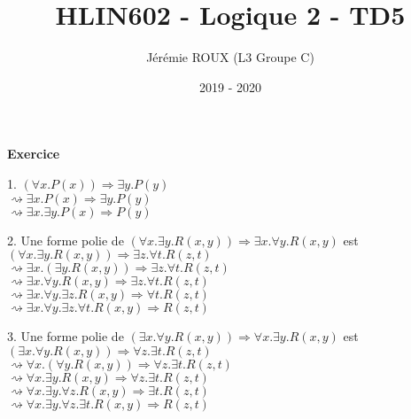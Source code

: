 \documentclass[11pt,letterpaper]{article}
\author{Jérémie ROUX (L3 Groupe C)}
\title{HLIN602 - Logique 2 - TD5}
\date{2019 - 2020}
\newcommand{\exo}[1]{\Large \textbf{Exercice \numprint{#1}} \vspace{10px} \normalsize}
\newcommand\tab[1][12pt]{\hspace*{#1}}
\begin{document}
\maketitle

\exo{1}

1. $(\forall x.P(x))\Rightarrow \exists y.P(y)$\\\tab 
$\rightsquigarrow \exists x.P(x)\Rightarrow \exists y.P(y)$\\\tab
$\rightsquigarrow \exists x.\exists y.P(x)\Rightarrow P(y)$

\vspace{13px}

2. Une forme polie de $(\forall x.\exists y.R(x,y))\Rightarrow \exists x.\forall y.R(x,y)$ est\\\tab
$(\forall x.\exists y.R(x,y))\Rightarrow \exists z.\forall t.R(z,t)$\\\tab
$\rightsquigarrow \exists x.(\exists y.R(x,y))\Rightarrow \exists z.\forall t.R(z,t)$\\\tab
$\rightsquigarrow \exists x.\forall y.R(x,y)\Rightarrow \exists z.\forall t.R(z,t)$\\\tab
$\rightsquigarrow \exists x.\forall y.\exists z.R(x,y)\Rightarrow \forall t.R(z,t)$\\\tab
$\rightsquigarrow \exists x.\forall y.\exists z.\forall t.R(x,y)\Rightarrow R(z,t)$

\vspace{13px}

3. Une forme polie de $(\exists x.\forall y.R(x,y))\Rightarrow \forall x.\exists y.R(x,y)$ est\\\tab
$(\exists x.\forall y.R(x,y))\Rightarrow \forall z.\exists t.R(z,t)$\\\tab
$\rightsquigarrow \forall x.(\forall y.R(x,y))\Rightarrow \forall z.\exists t.R(z,t)$\\\tab
$\rightsquigarrow \forall x.\exists y.R(x,y)\Rightarrow \forall z.\exists t.R(z,t)$\\\tab
$\rightsquigarrow \forall x.\exists y.\forall z.R(x,y)\Rightarrow \exists t.R(z,t)$\\\tab
$\rightsquigarrow \forall x.\exists y.\forall z.\exists t.R(x,y)\Rightarrow R(z,t)$

\vspace{13px}
\end{document}
